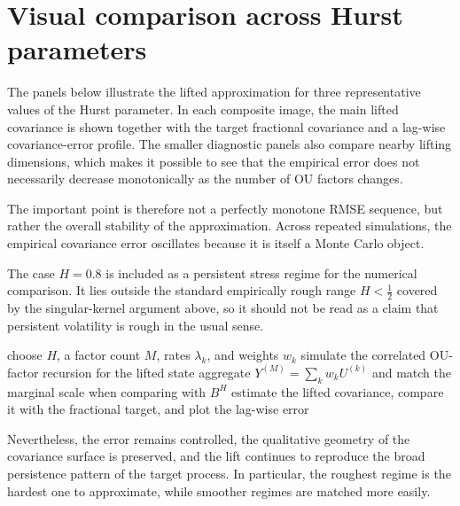 \documentclass[a4paper,10pt,titlepage,oneside,openany]{book}
\theoremstyle{plain}
\theoremstyle{definition}
\theoremstyle{remark}
\newcommand{\1}{\mathbf{1}}
\begin{document}
\section{Visual comparison across Hurst parameters}

The panels below illustrate the lifted approximation for three representative values of the Hurst parameter. In each composite image, the main lifted covariance is shown together with the target fractional covariance and a lag-wise covariance-error profile. The smaller diagnostic panels also compare nearby lifting dimensions, which makes it possible to see that the empirical error does not necessarily decrease monotonically as the number of OU factors changes.

The important point is therefore not a perfectly monotone RMSE sequence, but rather the overall stability of the approximation. Across repeated simulations, the empirical covariance error oscillates because it is itself a Monte Carlo object. 

The case $H=0.8$ is included as a persistent stress regime for the numerical comparison. It lies outside the standard empirically rough range $H<\tfrac12$ covered by the singular-kernel argument above, so it should not be read as a claim that persistent volatility is rough in the usual sense.

\begin{algorithm}[H]
\caption{Reading the Markovian-lifting diagnostic panels}
\DontPrintSemicolon
choose \(H\), a factor count \(M\), rates \(\lambda_k\), and weights \(w_k\)\;
simulate the correlated OU-factor recursion for the lifted state\;
aggregate \(Y^{(M)}=\sum_k w_k U^{(k)}\) and match the marginal scale when comparing with \(B^H\)\;
estimate the lifted covariance, compare it with the fractional target, and plot the lag-wise error\;
\end{algorithm}

Nevertheless, the error remains controlled, the qualitative geometry of the covariance surface is preserved, and the lift continues to reproduce the broad persistence pattern of the target process. In particular, the roughest regime is the hardest one to approximate, while smoother regimes are matched more easily.
\end{document}

